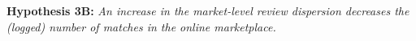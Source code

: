 \documentclass[msom,blindrev]{informs3}
\begin{document}
	\noindent\textbf{Hypothesis 3B:} \emph{An increase in the market-level review dispersion decreases the (logged) number of matches in the online marketplace.}
	
	
	
	
\end{document}
